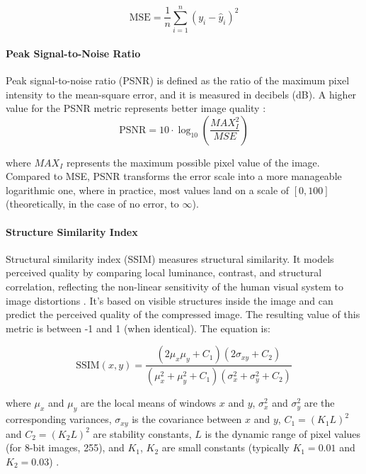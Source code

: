 \documentclass[conference]{IEEEtran}
\begin{document}
\begin{equation}
    \text{MSE} = \frac{1}{n} \sum_{i=1}^{n} (y_i - \hat{y}_i)^2
\end{equation}

\paragraph{Peak Signal-to-Noise Ratio}
Peak signal-to-noise ratio (PSNR) is defined as the ratio of the maximum pixel intensity to the mean-square error, and it is measured in decibels (dB). A higher value for the PSNR metric represents better image quality \cite{ungureanu_image-compression_2024}:
\begin{equation}
    \text{PSNR} = 10 \cdot \log_{10} \left( \frac{MAX_I^2}{MSE} \right)
\end{equation}

where $MAX_I$ represents the maximum possible pixel value of the image. Compared to MSE, PSNR transforms the error scale into a more manageable logarithmic one, where in practice, most values land on a scale of $[0, 100]$ (theoretically, in the case of no error, to $\infty$).

\paragraph{Structure Similarity Index}
Structural similarity index (SSIM) measures structural similarity. It models perceived quality by comparing local luminance, contrast, and structural correlation, reflecting the non-linear sensitivity of the human visual system to image distortions \cite{cheng_deep_2018}. It's based on visible structures inside the image and can predict the perceived quality of the compressed image. 
The resulting value of this metric is between -1 and 1 (when identical). The equation is:

\begin{equation}
\mathrm{SSIM}(x,y) =
\frac{(2\mu_x \mu_y + C_1)(2\sigma_{xy} + C_2)}
     {(\mu_x^2 + \mu_y^2 + C_1)(\sigma_x^2 + \sigma_y^2 + C_2)}
\end{equation}

where $\mu_x$ and $\mu_y$ are the local means of windows $x$ and $y$, 
$\sigma_x^2$ and $\sigma_y^2$ are the corresponding variances, 
$\sigma_{xy}$ is the covariance between $x$ and $y$, 
$C_1 = (K_1 L)^2$ and $C_2 = (K_2 L)^2$ are stability constants, 
$L$ is the dynamic range of pixel values (for 8-bit images, 255), 
and $K_1$, $K_2$ are small constants (typically $K_1=0.01$ and $K_2=0.03$) \cite{ungureanu_image-compression_2024}.
\end{document}
